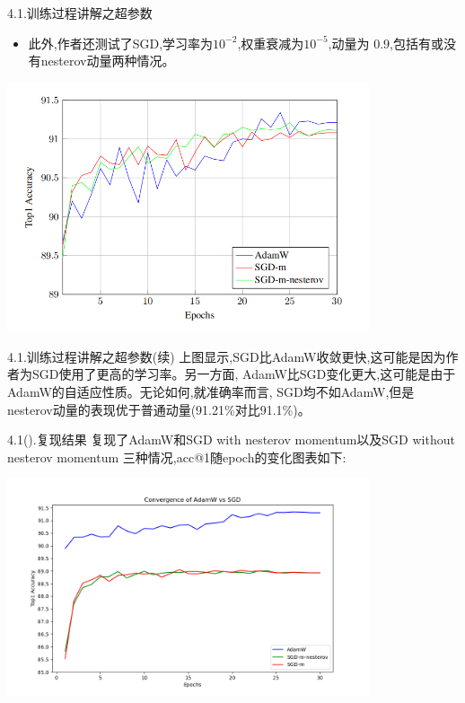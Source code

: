 \documentclass[UTF8]{ctexbeamer}
\begin{document}
\begin{frame}{4.1.训练过程讲解之超参数}
  \begin{itemize}
    \item 此外,作者还测试了SGD,学习率为$10^{-2}$,权重衰减为$10^{-5}$,动量为
    $0.9$,包括有或没有nesterov动量两种情况。
  \end{itemize}
  \begin{center}
    \includegraphics[width=0.8\textwidth]{2.png}
  \end{center}
\end{frame}

\begin{frame}{4.1.训练过程讲解之超参数(续)}
  上图显示,SGD比AdamW收敛更快,这可能是因为作者为SGD使用了更高的学习率。另一方面,
  AdamW比SGD变化更大,这可能是由于AdamW的自适应性质。无论如何,就准确率而言,
  SGD均不如AdamW,但是nesterov动量的表现优于普通动量(91.21\%对比91.1\%)。
\end{frame}

\begin{frame}{4.1(\ast).复现结果}
  复现了AdamW和SGD with nesterov momentum以及SGD without nesterov momentum
  三种情况,acc@1随epoch的变化图表如下:
  \begin{center}
    \includegraphics[width=0.8\textwidth]{1.png}
  \end{center}
\end{frame}
\end{document}
